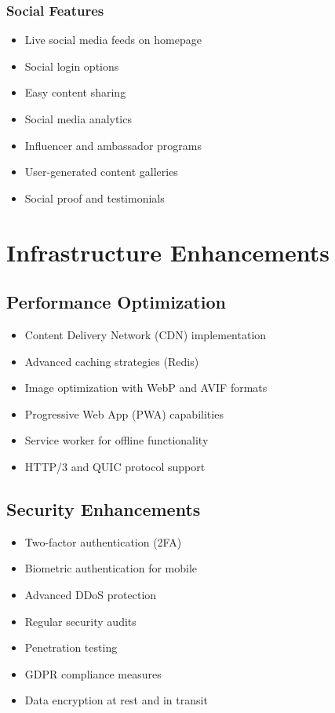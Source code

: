 \documentclass[12pt,a4paper]{report}
\begin{document}
\subsubsection*{Social Features}
\begin{itemize}
    \item Live social media feeds on homepage
    \item Social login options
    \item Easy content sharing
    \item Social media analytics
    \item Influencer and ambassador programs
    \item User-generated content galleries
    \item Social proof and testimonials
\end{itemize}

\section{Infrastructure Enhancements}

\subsection{Performance Optimization}

\begin{itemize}
    \item Content Delivery Network (CDN) implementation
    \item Advanced caching strategies (Redis)
    \item Image optimization with WebP and AVIF formats
    \item Progressive Web App (PWA) capabilities
    \item Service worker for offline functionality
    \item HTTP/3 and QUIC protocol support
\end{itemize}

\subsection{Security Enhancements}

\begin{itemize}
    \item Two-factor authentication (2FA)
    \item Biometric authentication for mobile
    \item Advanced DDoS protection
    \item Regular security audits
    \item Penetration testing
    \item GDPR compliance measures
    \item Data encryption at rest and in transit
\end{itemize}
\end{document}
